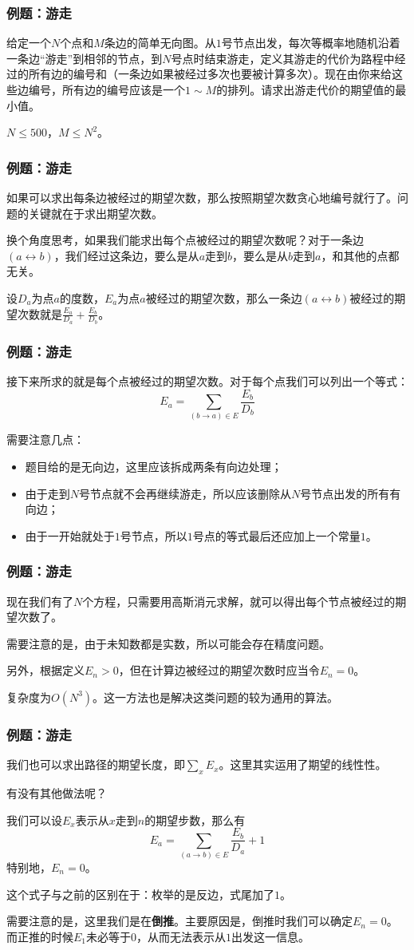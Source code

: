 \documentclass[9pt,dvipsnames]{beamer}
\begin{document}
\begin{frame}
	\frametitle{例题：游走}
	给定一个$N$个点和$M$条边的简单无向图。从$1$号节点出发，每次等概率地随机沿着一条边``游走''到相邻的节点，到$N$号点时结束游走，定义其游走的代价为路程中经过的所有边的编号和（一条边如果被经过多次也要被计算多次）。现在由你来给这些边编号，所有边的编号应该是一个$1\sim M$的排列。请求出游走代价的期望值的最小值。

	$N\leq 500$，$M\leq N^2$。
\end{frame}
\begin{frame}
	\frametitle{例题：游走}
	如果可以求出每条边被经过的期望次数，那么按照期望次数贪心地编号就行了。问题的关键就在于求出期望次数。\pause

	换个角度思考，如果我们能求出每个点被经过的期望次数呢？对于一条边$(a\leftrightarrow b)$，我们经过这条边，要么是从$a$走到$b$，要么是从$b$走到$a$，和其他的点都无关。

	设$D_a$为点$a$的度数，$E_a$为点$a$被经过的期望次数，那么一条边$(a\leftrightarrow b)$被经过的期望次数就是$\frac{E_a}{D_a}+\frac{E_b}{D_b}$。
\end{frame}
\begin{frame}
	\frametitle{例题：游走}
	接下来所求的就是每个点被经过的期望次数。对于每个点我们可以列出一个等式：
	\[ E_a=\sum_{(b\rightarrow a)\in E} \frac{E_b}{D_b} \]

	需要注意几点：
	\begin{itemize}
		\item 题目给的是无向边，这里应该拆成两条有向边处理；
		\item 由于走到$N$号节点就不会再继续游走，所以应该删除从$N$号节点出发的所有有向边；
		\item 由于一开始就处于$1$号节点，所以$1$号点的等式最后还应加上一个常量$1$。
	\end{itemize}
\end{frame}
\begin{frame}
	\frametitle{例题：游走}
	现在我们有了$N$个方程，只需要用高斯消元求解，就可以得出每个节点被经过的期望次数了。

	需要注意的是，由于未知数都是实数，所以可能会存在精度问题。

	另外，根据定义$E_n>0$，但在计算边被经过的期望次数时应当令$E_n=0$。

	复杂度为$O(N^3)$。这一方法也是解决这类问题的较为通用的算法。
\end{frame}
\begin{frame}
	\frametitle{例题：游走}
	我们也可以求出路径的期望长度，即$\sum_x E_x$。这里其实运用了期望的线性性。

	有没有其他做法呢？\pause
	\vspace{1em}

	我们可以设$E_x$表示从$x$走到$n$的期望步数，那么有
	\[ E_a=\sum_{(a\rightarrow b)\in E} \frac{E_b}{D_a} + 1 \]
	特别地，$E_n=0$。

	这个式子与之前的区别在于：枚举的是反边，式尾加了$1$。

	需要注意的是，这里我们是在\textbf{倒推}。主要原因是，倒推时我们可以确定$E_n=0$。而正推的时候$E_1$未必等于$0$，从而无法表示从$1$出发这一信息。
\end{frame}
\end{document}
